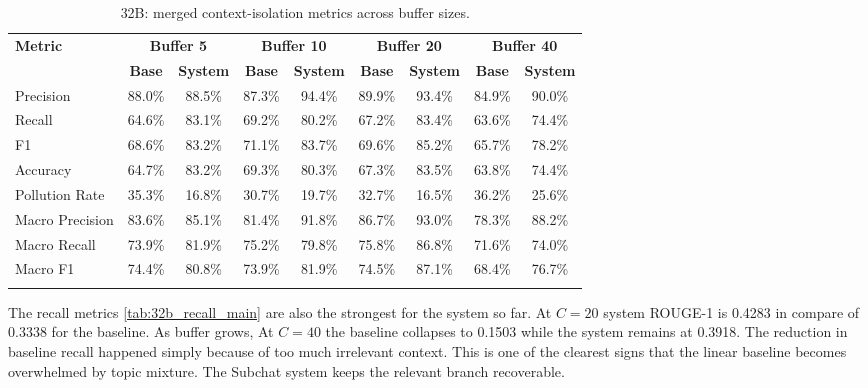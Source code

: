 \begin{table}[htbp]
\caption{32B: merged context-isolation metrics across buffer sizes.}\label{tab:32b_context_main}
\centering
\scriptsize
\setlength{\tabcolsep}{3pt}
\begin{adjustbox}{width=\textwidth}
\begin{tabular}{lcccccccc}
\toprule
\textbf{Metric} & \multicolumn{2}{c}{\textbf{Buffer 5}} & \multicolumn{2}{c}{\textbf{Buffer 10}} & \multicolumn{2}{c}{\textbf{Buffer 20}} & \multicolumn{2}{c}{\textbf{Buffer 40}} \\
\cmidrule(lr){2-3}\cmidrule(lr){4-5}\cmidrule(lr){6-7}\cmidrule(lr){8-9}
 & \textbf{Base} & \textbf{System} & \textbf{Base} & \textbf{System} & \textbf{Base} & \textbf{System} & \textbf{Base} & \textbf{System} \\
\midrule
Precision & 88.0\% & 88.5\% & 87.3\% & 94.4\% & 89.9\% & 93.4\% & 84.9\% & 90.0\% \\
Recall & 64.6\% & 83.1\% & 69.2\% & 80.2\% & 67.2\% & 83.4\% & 63.6\% & 74.4\% \\
F1 & 68.6\% & 83.2\% & 71.1\% & 83.7\% & 69.6\% & 85.2\% & 65.7\% & 78.2\% \\
Accuracy & 64.7\% & 83.2\% & 69.3\% & 80.3\% & 67.3\% & 83.5\% & 63.8\% & 74.4\% \\
Pollution Rate & 35.3\% & 16.8\% & 30.7\% & 19.7\% & 32.7\% & 16.5\% & 36.2\% & 25.6\% \\
Macro Precision & 83.6\% & 85.1\% & 81.4\% & 91.8\% & 86.7\% & 93.0\% & 78.3\% & 88.2\% \\
Macro Recall & 73.9\% & 81.9\% & 75.2\% & 79.8\% & 75.8\% & 86.8\% & 71.6\% & 74.0\% \\
Macro F1 & 74.4\% & 80.8\% & 73.9\% & 81.9\% & 74.5\% & 87.1\% & 68.4\% & 76.7\% \\
\botrule
\end{tabular}
\end{adjustbox}
\end{table}

The recall metrics \ref{tab:32b_recall_main} are also the strongest for the system so far. At $C=20$ system ROUGE-1 is 0.4283 in compare of 0.3338 for the baseline. As buffer grows, At $C=40$ the baseline collapses to 0.1503 while the system remains at 0.3918. The reduction in baseline recall happened simply because of too much irrelevant context. This is one of the clearest signs that the linear baseline becomes overwhelmed by topic mixture. The Subchat system keeps the relevant branch recoverable.











